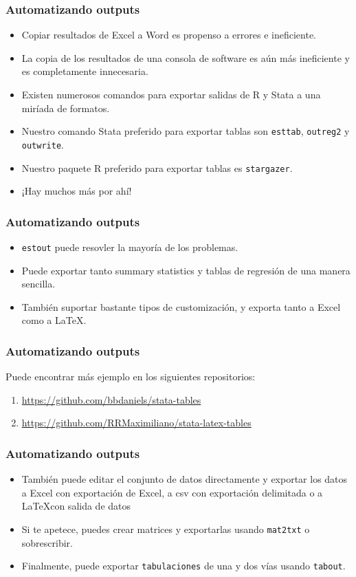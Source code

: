 \documentclass[10pt, aspectratio=169, compress]{beamer}
\begin{document}
\begin{frame}[t]
	\frametitle{Automatizando outputs}
	\begin{itemize}[<+->]
		\item Copiar resultados de Excel a Word es propenso a errores e ineficiente.
		\item La copia de los resultados de una consola de software es aún más ineficiente y es completamente innecesaria.
		\item Existen numerosos comandos para exportar salidas de R y Stata a una miríada de formatos.
		\item Nuestro comando Stata preferido para exportar tablas son \texttt{esttab}, \texttt{outreg2} y \texttt{outwrite}.
		\item Nuestro paquete R preferido para exportar tablas es \texttt{stargazer}.
		\item ¡Hay muchos más por ahí!
	\end{itemize}	
\end{frame}
\begin{frame}[t]
	\frametitle{Automatizando outputs}
	\begin{itemize}
		\item \texttt{estout} puede resovler la mayoría de los problemas. 
		\item Puede exportar tanto summary statistics y tablas de regresión de una manera sencilla. 
		\item También suportar bastante tipos de customización, y exporta tanto a Excel como a \LaTeX.
	\end{itemize}
\end{frame}
\begin{frame}[t]
	\frametitle{Automatizando outputs}
	
	Puede encontrar más ejemplo en los siguientes repositorios: 
	\begin{enumerate}
		\item \href{https://github.com/bbdaniels/stata-tables}{https://github.com/bbdaniels/stata-tables}
		\item \href{https://github.com/RRMaximiliano/stata-latex-tables}{https://github.com/RRMaximiliano/stata-latex-tables}
	\end{enumerate}
\end{frame}
\begin{frame}[t]
	\frametitle{Automatizando outputs}
	\begin{itemize}
		\item También puede editar el conjunto de datos directamente y exportar los datos a Excel con exportación de Excel, a csv con exportación delimitada o a \LaTeX con salida de datos
		\item Si te apetece, puedes crear matrices y exportarlas usando \texttt{mat2txt} o sobrescribir.
		\item Finalmente, puede exportar \texttt{tabulaciones} de una y dos vías usando \texttt{tabout}.
	\end{itemize}	
\end{frame}
\end{document}
